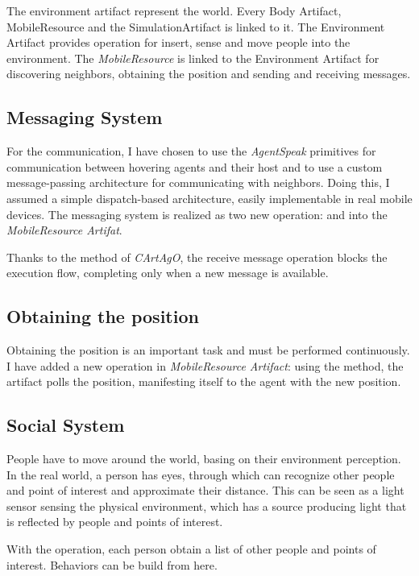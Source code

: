 The environment artifact represent the world. Every Body Artifact,
MobileResource and the SimulationArtifact is linked to it. The Environment
Artifact provides operation for insert, sense and move people into the
environment. The \emph{MobileResource} is linked to the Environment Artifact
for discovering neighbors, obtaining the position and sending and receiving
messages.

\subsection{Messaging System}

For the communication, I have chosen to use the \emph{AgentSpeak} primitives
for communication between hovering agents and their host and to use a custom
message-passing architecture for communicating with neighbors. Doing this, I
assumed a simple dispatch-based architecture, easily implementable in real
mobile devices. The messaging system is realized as two new operation:
 and  into the \emph{MobileResource
Artifat}.

Thanks to the  method of \emph{CArtAgO}, the receive message
operation blocks the execution flow, completing only when a new message is
available.

\subsection{Obtaining the position}

Obtaining the position is an important task and must be performed continuously.
I have added a new operation  in
\emph{MobileResource Artifact}: using the  method, the artifact
polls the position, manifesting itself to the agent with the new position.


\subsection{Social System}

People have to move around the world, basing on their environment perception.
In the real world, a person has eyes, through which can recognize other people
and point of interest and approximate their distance.  This can be seen as a
light sensor sensing the physical environment, which has a source producing
light that is reflected by people and points of interest.

With the  operation, each person obtain a list of other people and
points of interest. Behaviors can be build from here.

